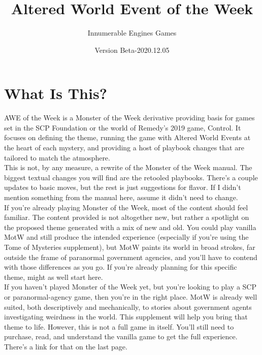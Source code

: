 \documentclass[10pt,oneside,landscape]{memoir}
\begin{document}
\title{Altered World Event of the Week}
\author{Innumerable Engines Games}
\date{Version Beta-2020.12.05}
\maketitle
\pagebreak

\fontsize{12}{14}\selectfont

\chapter*{What Is This?}
\begin{multicols}{2}

AWE of the Week is a Monster of the Week derivative providing basis for games set in the SCP Foundation or the world of Remedy’s 2019 game, Control.  It focuses on defining the theme, running the game with Altered World Events at the heart of each mystery, and providing a host of playbook changes that are tailored to match the atmosphere.
\\[4mm]
This is not, by any measure, a rewrite of the Monster of the Week manual.  The biggest textual changes you will find are the retooled playbooks.  There’s a couple updates to basic moves, but the rest is just suggestions for flavor.  If I didn’t mention something from the manual here, assume it didn’t need to change.
\\[4mm]
If you’re already playing Monster of the Week, most of the content should feel familiar.  The content provided is not altogether new, but rather a spotlight on the proposed theme generated with a mix of new and old.  You could play vanilla MotW and still produce the intended experience (especially if you’re using the Tome of Mysteries supplement), but MotW paints its world in broad strokes, far outside the frame of paranormal government agencies, and you’ll have to contend with those differences as you go.  If you’re already planning for this specific theme, might as well start here.
\\[4mm]
If you haven’t played Monster of the Week yet, but you’re looking to play a SCP or paranormal-agency game, then you’re in the right place.  MotW is already well suited, both descriptively and mechanically, to stories about government agents investigating weirdness in the world. This supplement will help you bring that theme to life.  However, this is not a full game in itself.  You’ll still need to purchase, read, and understand the vanilla game to get the full experience.  There’s a link for that on the last page.


\end{multicols}
\end{document}
